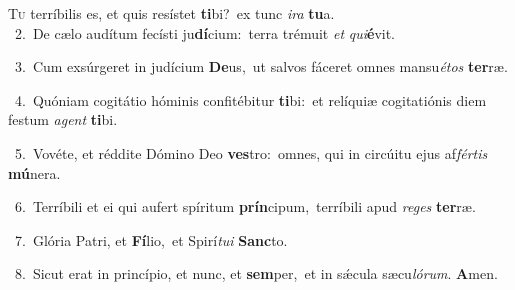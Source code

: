 \lettrine{\initial\textcolor{\initialcolor}{T}}{u} terríbilis es, et quis resístet \textbf{ti}\-bi?~\star ex tunc \textit{i}\-\textit{ra} \textbf{tu}\-a.\\
{\numbfont\textcolor{\numbcolor}{~2.}}~De cælo audítum fecísti ju\-\textbf{dí}\-cium:~\star terra trémuit \textit{et} \textit{qui}\-\textbf{é}vit.\par
{\numbfont\textcolor{\numbcolor}{~3.}}~Cum exsúrgeret in judícium \textbf{De}\-us,~\star ut salvos fáceret omnes mansu\-\textit{é}\-\textit{tos} \textbf{ter}\-ræ.\par
{\numbfont\textcolor{\numbcolor}{~4.}}~Quóniam cogitátio hóminis confitébitur \textbf{ti}\-bi:~\star et relíquiæ cogitatiónis diem festum \textit{a}\-\textit{gent} \textbf{ti}\-bi.\par
{\numbfont\textcolor{\numbcolor}{~5.}}~Vovéte, et réddite Dómino Deo \textbf{ves}\-tro:~\star omnes, qui in circúitu ejus af\-\textit{fér}\-\textit{tis} \textbf{mú}\-nera.\par
{\numbfont\textcolor{\numbcolor}{~6.}}~Terríbili et ei qui aufert spíritum \textbf{prín}\-cipum,~\star terríbili apud \textit{re}\-\textit{ges} \textbf{ter}\-ræ.\par
{\numbfont\textcolor{\numbcolor}{~7.}}~Glória Patri, et \textbf{Fí}\-lio,~\star et Spirí\-\textit{tu}\-\textit{i} \textbf{Sanc}\-to.\par
{\numbfont\textcolor{\numbcolor}{~8.}}~Sicut erat in princípio, et nunc, et \textbf{sem}\-per,~\star et in sǽcula sæcu\-\textit{ló}\-\textit{rum}. \textbf{A}\-men.\par
